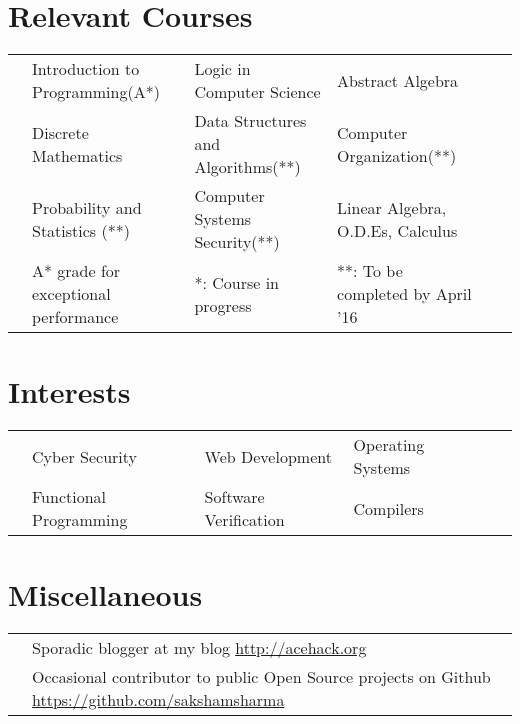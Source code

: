 \documentclass[11pt,a4paper]{article}
\begin{document}
\vspace{-0.6cm}
\section*{Relevant Courses}
\vspace{-0.3cm}
\begin{tabular}{L{0.05cm} L{5.8cm} L{6.5cm} L{7.5cm} L{8cm} L{13cm}}
  & Introduction to Programming(A*)  & Logic in Computer Science & Abstract Algebra\\
& Discrete Mathematics             & Data Structures and Algorithms(**) & Computer Organization(**)\\
& Probability and Statistics (**)  & Computer Systems Security(**) & Linear Algebra, O.D.Es, Calculus\\
  \vspace{0.3cm}
& \footnotesize{A* grade for exceptional performance}
& \footnotesize{*: Course in progress}
& \footnotesize{**: To be completed by April '16}
\end{tabular}

\vspace{-0.8cm}
\section*{Interests}
\vspace{-0.3cm}
\begin{tabular}{L{0.05cm} L{5.8cm} L{6.5cm} L{7.5cm} L{8cm} L{13cm}}
  & Cyber Security         & Web Development       & Operating Systems\\
  & Functional Programming & Software Verification & Compilers
\end{tabular}

\vspace{-0.5cm}
\section*{Miscellaneous}
\vspace{-0.3cm}
\begin{tabular}{L{0.05cm} l}
  & Sporadic blogger at my blog \url{http://acehack.org}\\
  & Occasional contributor to public Open Source projects on Github \url{https://github.com/sakshamsharma}
\end{tabular}
\end{document}
